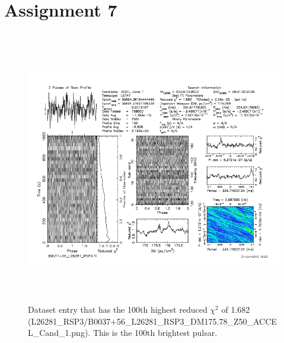 \documentclass[a4paper]{article}
\begin{document}
\section*{Assignment 7}
\begin{figure}[h!] 
\begin{center} 
\includegraphics[height=12cm]{100th-Brightest.png} 
\caption{Dataset entry that has the 100th highest reduced $\chi^2$ of 1.682 (L26281\_RSP3/B0037+56\_L26281\_RSP3\_DM175.78\_Z50\_ACCEL\_Cand\_1.png). This is the 100th brightest pulsar.}
\label{fig:brightest} 
\end{center} 
\end{figure} 


%
\end{document}

